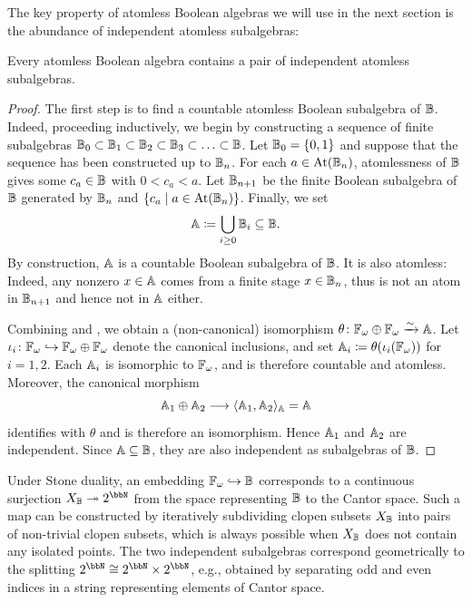 \documentclass{amsart}
\begin{document}
    The key property of atomless Boolean algebras we will use in the next section is the abundance of independent atomless subalgebras:
    
    \begin{Prop}\label{prop:splittingprinciple}
        Every atomless Boolean algebra contains a pair of independent atomless subalgebras.
    \end{Prop}
    \begin{proof}
        The first step is to find a countable atomless Boolean subalgebra of $\mathbb{B}$. Indeed, proceeding inductively, we begin by constructing a sequence of finite subalgebras $\mathbb{B}_0 \subset \mathbb{B}_1 \subset \mathbb{B}_2 \subset \mathbb{B}_3 \subset \ldots \subset \mathbb{B}$. Let $\mathbb{B}_0 = \{0,1\}$ and suppose that the sequence has been constructed up to $\mathbb{B}_n$. For each $a \in \operatorname{At}(\mathbb{B}_n)$, atomlessness of $\mathbb{B}$ gives some $c_a \in \mathbb{B}$ with $0 < c_a < a$. Let $\mathbb{B}_{n+1}$ be the finite Boolean subalgebra of $\mathbb{B}$ generated by $\mathbb{B}_{n}$ and $\{c_a\mid a \in \operatorname{At}(\mathbb{B}_n)\}$. Finally, we set
            \[
                \mathbb{A} \coloneqq \bigcup_{i \geq 0}\mathbb{B}_i \subseteq \mathbb{B}.
            \]
        By construction, $\mathbb{A}$ is a countable Boolean subalgebra of $\mathbb{B}$. It is also atomless: Indeed, any nonzero $x \in \mathbb{A}$ comes from a finite stage $x \in \mathbb{B}_n$, thus is not an atom in $\mathbb{B}_{n+1}$ and hence not in $\mathbb{A}$ either.
    
        Combining  and , we obtain a (non-canonical) isomorphism $\theta \colon \mathbb{F}_{\omega} \oplus \mathbb{F}_{\omega} \xrightarrow{\sim} \mathbb{A}$. Let $\iota_i\colon\mathbb{F}_{\omega}\hookrightarrow\mathbb{F}_{\omega}\oplus\mathbb{F}_{\omega}$ denote the canonical inclusions, and set $\mathbb{A}_i\coloneqq\theta(\iota_i(\mathbb{F}_{\omega}))$ for $i=1,2$. Each $\mathbb{A}_i$ is isomorphic to $\mathbb{F}_{\omega}$, and is therefore countable and atomless. Moreover, the canonical morphism
        \[
        \mathbb{A}_1\oplus\mathbb{A}_2\longrightarrow\langle\mathbb{A}_1,\mathbb{A}_2\rangle_{\mathbb{A}}=\mathbb{A}
        \]
        identifies with $\theta$ and is therefore an isomorphism. Hence $\mathbb{A}_1$ and $\mathbb{A}_2$ are independent. Since $\mathbb{A}\subseteq\mathbb{B}$, they are also independent as subalgebras of $\mathbb{B}$.
    \end{proof}
    
    \begin{Rem}
        Under Stone duality, an embedding $\mathbb{F}_{\omega} \hookrightarrow \mathbb{B}$ corresponds to a continuous surjection $X_{\ba{B}} \twoheadrightarrow 2^{\bbN}$ from the space representing $\mathbb{B}$ to the Cantor space. Such a map can be constructed by iteratively subdividing clopen subsets $X_{\mathbb{B}} $ into pairs of non-trivial clopen subsets, which is always possible when $X_{\mathbb{B}}$ does not contain any isolated points. The two independent subalgebras correspond geometrically to the splitting $2^{\bbN} \cong 2^{\bbN} \times 2^{\bbN}$, e.g., obtained by separating odd and even indices in a string representing elements of Cantor space.
    \end{Rem}
    
\end{document}
